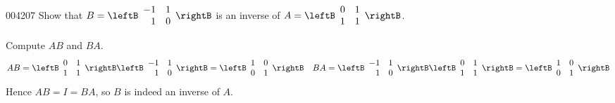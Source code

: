 \hspace*{0em}\vspace*{-3em}
\begin{example}{}{004207}
Show that $B = \leftB \begin{array}{rr}
-1 & 1 \\
1 & 0
\end{array} \rightB$
 is an inverse of $A = \leftB \begin{array}{rr}
 0 & 1 \\
 1 & 1
 \end{array} \rightB$.

\begin{solution}
  Compute $AB$ and $BA$.
\begin{equation*}
AB = \leftB \begin{array}{rr}
0 & 1 \\
1 & 1
\end{array} \rightB \leftB \begin{array}{rr}
-1 & 1 \\
1 & 0
\end{array} \rightB = \leftB \begin{array}{rr}
1 & 0 \\
0 & 1
\end{array} \rightB \quad
BA = \leftB \begin{array}{rr}
-1 & 1 \\
1 & 0
\end{array} \rightB \leftB \begin{array}{rr}
0 & 1 \\
1 & 1
\end{array} \rightB = \leftB \begin{array}{rr}
1 & 0 \\
0 & 1
\end{array} \rightB
\end{equation*}
Hence $AB = I = BA$, so $B$ is indeed an inverse of $A$.
\end{solution}
\end{example}

